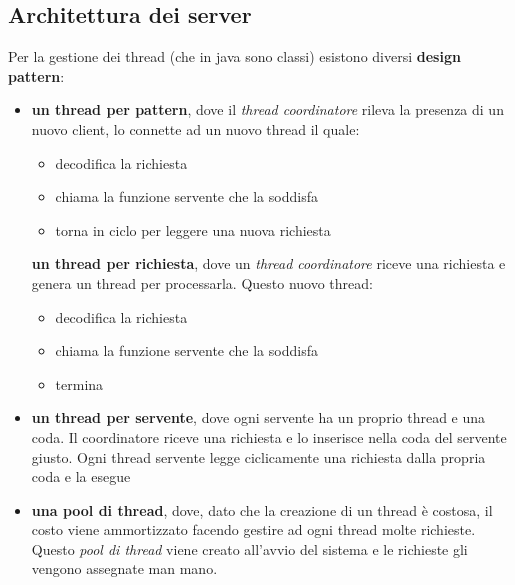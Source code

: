 \documentclass[a4paper,12pt, oneside]{book}
\begin{document}
\subsection{Architettura dei server}
Per la gestione dei thread (che in java sono classi) esistono diversi \textbf{design pattern}:
\begin{itemize}
	\item \textbf{un thread per pattern}, dove il \textit{thread coordinatore} rileva la presenza di un nuovo client, lo connette ad un nuovo thread il quale:
	      \begin{itemize}
		      \item decodifica la richiesta
		      \item chiama la funzione servente che la soddisfa
		      \item torna in ciclo per leggere una nuova richiesta
	      \end{itemize}
	      \textbf{un thread per richiesta}, dove un \textit{thread coordinatore} riceve una richiesta e genera un thread per processarla. Questo nuovo thread:
	      \begin{itemize}
		      \item decodifica la richiesta
		      \item chiama la funzione servente che la soddisfa
		      \item termina
	      \end{itemize}
	\item \textbf{un thread per servente}, dove ogni servente ha un proprio thread e una coda. Il coordinatore riceve una richiesta e lo inserisce nella coda del servente giusto. Ogni thread servente legge ciclicamente una richiesta dalla
	      propria coda e la esegue
	\item \textbf{una pool di thread}, dove, dato che la creazione di un thread è costosa, il costo viene ammortizzato facendo gestire ad ogni thread molte richieste. Questo \textit{pool di thread} viene creato all'avvio del sistema e le richieste gli vengono assegnate man mano.
\end{itemize}
\end{document}
